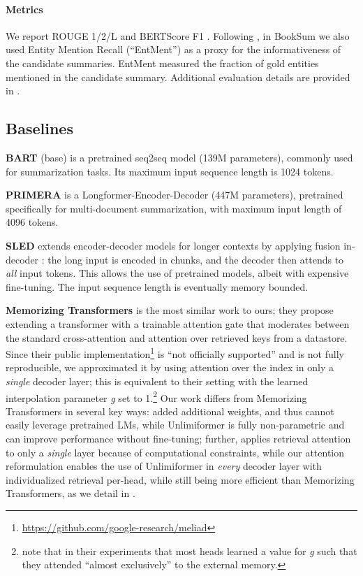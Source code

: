 \documentclass{article}
\newcommand{\ours}{Unlimiformer\xspace}
\begin{document}
\paragraph{Metrics}
We report ROUGE 1/2/L \citep{lin-2004-rouge} and BERTScore F1 \citep{bertscore}. Following 
\citet{zhang-etal-2021-leveraging-pretrained}, 
in BookSum we also used Entity Mention Recall (``EntMent'') as a proxy for the informativeness of the candidate summaries. EntMent measured the fraction of gold entities mentioned in the candidate summary.
Additional evaluation details are provided in .

\subsection{Baselines}
\textbf{BART} (base) \citep{lewis-etal-2020-bart} is a pretrained seq2seq model (139M parameters), commonly used for summarization tasks. Its maximum input sequence length is 1024 tokens.

\textbf{PRIMERA} \citep{xiao-etal-2022-primera} is a Longformer-Encoder-Decoder \cite[LED$_{\texttt{large}}$; ][]{beltagy2020longformer}  (447M parameters), pretrained specifically for multi-document summarization, with maximum input length of 4096 tokens. 

\textbf{SLED} \citep{sled} extends encoder-decoder models for longer contexts by applying fusion in-decoder \citep{izacard-grave-2021-leveraging}: the long input is encoded in chunks, and the decoder then attends to \emph{all} input tokens.
This allows the use of pretrained models, albeit with expensive fine-tuning. The input sequence length is eventually memory bounded. 

\textbf{Memorizing Transformers} \citep{memtrans} is the most similar work to ours; they propose extending a transformer with a trainable attention gate that moderates between the standard cross-attention and attention over retrieved keys from a datastore. %
Since their public implementation\footnote{\url{https://github.com/google-research/meliad}} 
is ``not officially supported'' and is not fully reproducible,
we approximated it by using attention over the index in only a \emph{single} decoder layer; this is equivalent to their setting with the learned interpolation parameter \textit{g} set to 1.\footnote{\citet{memtrans} note that in their experiments that most heads learned a value for \textit{g} such that they attended ``almost exclusively'' to the external memory.} Our work differs from Memorizing Transformers in several key ways: \citet{memtrans} added additional weights, and thus cannot easily leverage pretrained LMs, while Unlimiformer is fully non-parametric and can improve performance without fine-tuning; further, \citet{memtrans} applies retrieval attention  to only a \emph{single} layer because of computational constraints, while our attention reformulation enables the use of \ours in \emph{every} decoder layer with individualized retrieval per-head, while still being more efficient than Memorizing Transformers, as we detail in . 
\end{document}

